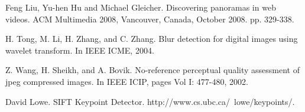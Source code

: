 
\begin{thebibliography}{99}

  
 Feng Liu, Yu-hen Hu and Michael Gleicher. Discovering panoramas in web videos. 
ACM Multimedia 2008, Vancouver, Canada, October 2008. pp. 329-338.  

 H. Tong, M. Li, H. Zhang, and C. Zhang. Blur
detection for digital images using wavelet transform.
In IEEE ICME, 2004.

 Z. Wang, H. Sheikh, and A. Bovik. No-reference
perceptual quality assessment of jpeg compressed
images. In IEEE ICIP, pages Vol I: 477-480, 2002.

 David Lowe. SIFT Keypoint Detector.
http://www.cs.ubc.ca/~lowe/keypoints/.


\end{thebibliography}

